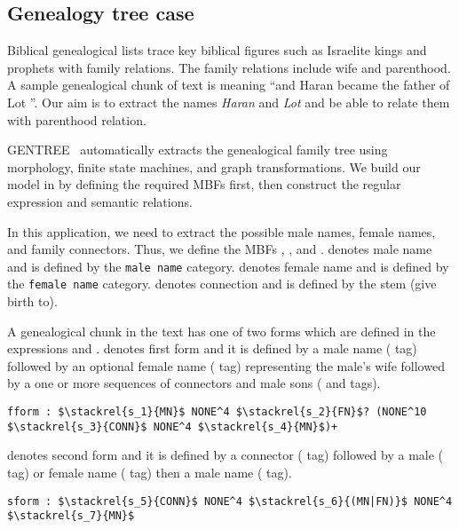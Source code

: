 \begin{appendices}
\newpage

\section{Genealogy tree case}
\label{a:gen}

Biblical genealogical lists trace key biblical figures such as Israelite kings and
prophets with family relations. 
The family relations include wife and parenthood. 
A sample genealogical chunk of text is  
meaning ``and Haran became the father of Lot
''. 
Our aim is to extract the names {\em Haran} and {\em Lot} and be able to relate them with parenthood relation.

GENTREE~\cite{ZaMaHaCicling2012Entity} automatically 
extracts the genealogical family tree using morphology, 
finite state machines, and graph transformations. 
We build our model in \framework by defining the required MBFs first, then construct 
the regular expression and semantic relations.

In this application, we need to extract the possible male names, female names, 
and family connectors. 
Thus, we define the MBFs , , and . 
 denotes male name and is defined by the {\tt male name} category. 
 denotes female name and is defined by the {\tt female name} category. 
 denotes connection and is defined by the stem  (give birth to).

A genealogical chunk in the text has one of two forms which are 
defined in the expressions  and . 
 denotes first form and it is defined by a male name ( tag) followed by an optional  female name ( tag) representing the male's wife followed by a one or more sequences of connectors and male sons ( and  tags). 

\begin{Verbatim}[fontsize=\relsize{-1},commandchars=\\\{\},codes={\catcode`$=3 \catcode`_=8}]
fform : $\stackrel{s_1}{MN}$ NONE^4 $\stackrel{s_2}{FN}$? (NONE^10 $\stackrel{s_3}{CONN}$ NONE^4 $\stackrel{s_4}{MN}$)+
\end{Verbatim}

 denotes second form and it is defined by a connector ( tag) followed by a male ( tag) or female name ( tag) then a male name ( tag). 

\begin{Verbatim}[fontsize=\relsize{-1},commandchars=\\\{\},codes={\catcode`$=3 \catcode`_=8}]
sform : $\stackrel{s_5}{CONN}$ NONE^4 $\stackrel{s_6}{(MN|FN)}$ NONE^4 $\stackrel{s_7}{MN}$
\end{Verbatim}


\end{appendices}
